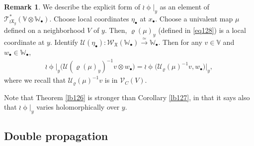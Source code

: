\documentclass[12pt,a4paper,notitlepage]{report}
\theoremstyle{definition}
\newtheorem{rem}[df]{Remark}
\theoremstyle{plain}
\newcommand{\fk}{\mathfrak}
\newcommand{\mc}{\mathcal}
\newcommand{\scr}{\mathscr}
\newcommand{\blt}{\bullet}
\newcommand{\Vbb}{\mathbb V}
\newcommand{\Wbb}{\mathbb W}
\numberwithin{equation}{section}
\begin{document}
\begin{rem}
We describe the explicit form of $\wr\upphi|_y$ as an element of $\scr T_{\wr\fk X_y}^*(\Vbb\otimes\Wbb_\blt)$. Choose  local coordinates  $\eta_\blt$ at $x_\blt$. Choose  a univalent map $\mu$ defined on a neighborhood $V$ of $y$. Then, $\varrho(\mu)_y$ (defined in \eqref{eq128}) is a local coordinate at $y$.  Identify $\mc U(\eta_\blt):\scr W_{\fk X}(\Wbb_\blt)\xrightarrow{\simeq}\Wbb_\blt$.  Then for any $v\in\Vbb$ and $w_\blt\in\Wbb_\blt$,
\begin{align}
\wr\upphi\big|_y\big(\mc U(\varrho(\mu)_y)^{-1}v\otimes w_\blt\big)=\wr\upphi\big(\mc U_\varrho(\mu)^{-1}v,w_\blt\big)\big|_y,
\end{align}
where we recall that $\mc U_\varrho(\mu)^{-1}v$ is in $\scr V_C(V)$.

Note that Theorem \ref{lb126} is stronger than Corollary \ref{lb127}, in that it says also that $\wr\upphi|_y$ varies holomorphically over $y$.
\end{rem}




\subsection*{Double propagation}
\end{document}
